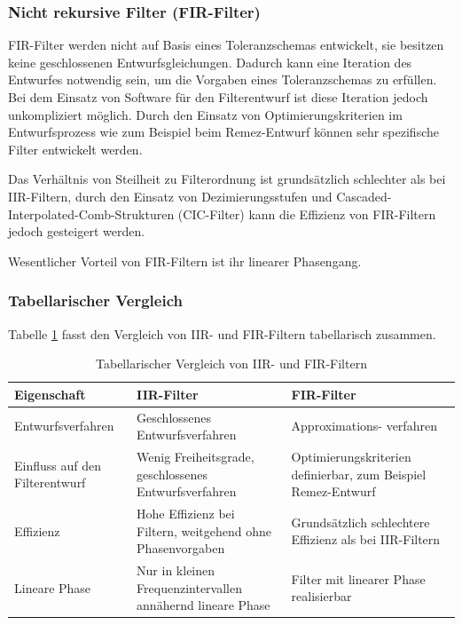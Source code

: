\subsubsection{Nicht rekursive Filter (FIR-Filter)}\label{sec:nicht-rekursive-filter-fir-filter}

FIR-Filter werden nicht auf Basis eines Toleranzschemas entwickelt, sie besitzen keine geschlossenen Entwurfsgleichungen. Dadurch kann eine Iteration des Entwurfes notwendig sein, um die Vorgaben eines Toleranzschemas zu erfüllen. Bei dem Einsatz von Software für den Filterentwurf ist diese Iteration jedoch unkompliziert möglich. Durch den Einsatz von Optimierungskriterien im Entwurfsprozess wie zum Beispiel beim Remez-Entwurf können sehr spezifische Filter entwickelt werden.

Das Verhältnis von Steilheit zu Filterordnung ist grundsätzlich schlechter als bei IIR-Filtern, durch den Einsatz von Dezimierungsstufen und Cascaded-Interpolated-Comb-Strukturen (CIC-Filter) kann die Effizienz von FIR-Filtern jedoch gesteigert werden.

Wesentlicher Vorteil von FIR-Filtern ist ihr linearer Phasengang.

\subsubsection{Tabellarischer Vergleich}\label{sec:tabellarischer-vergleich}

Tabelle \ref{tab:9.9} fasst den Vergleich von IIR- und FIR-Filtern tabellarisch zusammen.

\begin{table}
  \centering
  \caption{Tabellarischer Vergleich von IIR- und FIR-Filtern}
  \label{tab:9.9}
  \begin{tabular}{lll}
    \toprule
    Eigenschaft & IIR-Filter & FIR-Filter \\
    \midrule
    Entwurfsverfahren & 
Geschlossenes 
Entwurfsverfahren
 & 
Approximations- 
verfahren \\
    Einfluss auf den Filterentwurf & 
Wenig Freiheitsgrade, 
geschlossenes Entwurfsverfahren
 & Optimierungskriterien definierbar, zum Beispiel Remez-Entwurf \\
    Effizienz & 
Hohe Effizienz bei Filtern, 
weitgehend ohne Phasenvorgaben
 & 
Grundsätzlich schlechtere 
Effizienz als bei IIR-Filtern \\
    Lineare Phase & Nur in kleinen Frequenzintervallen annähernd lineare Phase & 
Filter mit linearer Phase 
realisierbar \\
    \bottomrule
  \end{tabular}
\end{table}

